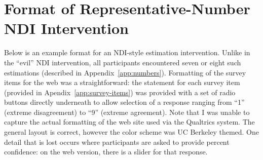 \chapter{Format of Representative-Number NDI Intervention}
\label{app:format-ndi}

Below is an example format for an NDI-style estimation intervention.  Unlike in
the “evil” NDI intervention, all participants encountered seven or eight such
estimations (described in Appendix~\ref{app:numbers}). Formatting of the survey
items for the web was a straightforward: the statement for each survey item
(provided in Apendix~\ref{app:survey-items}) was provided with a set of radio
buttons directly underneath to allow selection of a response ranging from “1”
(extreme disagreement) to “9” (extreme agreement). Note that I was unable to
capture the actual formatting of the web site used via the Qualtrics system. The
general layout is correct, however the color scheme was UC Berkeley themed. One
detail that is lost occurs where participants are asked to provide percent
confidence: on the web version, there is a slider for that response.


